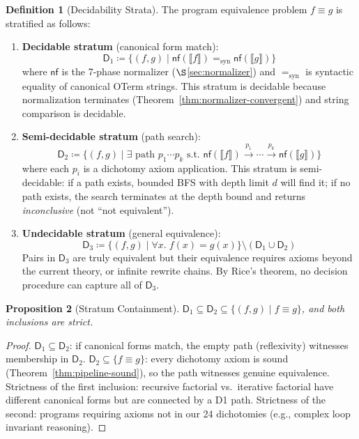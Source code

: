 \documentclass[11pt,a4paper]{report}
\theoremstyle{definition}
\newtheorem{definition}{Definition}[chapter]
\theoremstyle{plain}
\newtheorem{proposition}[definition]{Proposition}
\newcommand{\den}[1]{\llbracket #1 \rrbracket}
\begin{document}
\begin{definition}[Decidability Strata]
\label{def:decidability-strata}
The program equivalence problem $f \equiv g$ is stratified as follows:
\begin{enumerate}
  \item \textbf{Decidable stratum} (canonical form match):
  \[
    \mathsf{D}_1 \coloneqq \{(f,g) \mid \mathsf{nf}(\den{f}) =_{\mathrm{syn}} \mathsf{nf}(\den{g})\}
  \]
  where $\mathsf{nf}$ is the 7-phase normalizer
  ($\S$\ref{sec:normalizer}) and $=_{\mathrm{syn}}$ is syntactic
  equality of canonical OTerm strings.  This stratum is decidable
  because normalization terminates (Theorem~\ref{thm:normalizer-convergent})
  and string comparison is decidable.

  \item \textbf{Semi-decidable stratum} (path search):
  \[
    \mathsf{D}_2 \coloneqq \{(f,g) \mid \exists \text{ path } p_1 \cdots p_k
      \text{ s.t.\ } \mathsf{nf}(\den{f}) \xrightarrow{p_1} \cdots
      \xrightarrow{p_k} \mathsf{nf}(\den{g})\}
  \]
  where each $p_i$ is a dichotomy axiom application.  This stratum
  is semi-decidable: if a path exists, bounded BFS with depth limit
  $d$ will find it; if no path exists, the search terminates at the
  depth bound and returns \emph{inconclusive} (not ``not equivalent'').

  \item \textbf{Undecidable stratum} (general equivalence):
  \[
    \mathsf{D}_3 \coloneqq \{(f,g) \mid \forall x.\; f(x) = g(x)\} \setminus (\mathsf{D}_1 \cup \mathsf{D}_2)
  \]
  Pairs in $\mathsf{D}_3$ are truly equivalent but their equivalence
  requires axioms beyond the current theory, or infinite rewrite
  chains.  By Rice's theorem, no decision procedure can capture
  all of $\mathsf{D}_3$.
\end{enumerate}
\end{definition}

\begin{proposition}[Stratum Containment]
\label{prop:stratum-containment}
$\mathsf{D}_1 \subseteq \mathsf{D}_2 \subseteq \{(f,g) \mid f \equiv g\}$,
and both inclusions are strict.
\end{proposition}

\begin{proof}
$\mathsf{D}_1 \subseteq \mathsf{D}_2$: if canonical forms match,
the empty path (reflexivity) witnesses membership in $\mathsf{D}_2$.
$\mathsf{D}_2 \subseteq \{f \equiv g\}$: every dichotomy axiom is
sound (Theorem~\ref{thm:pipeline-sound}), so the path witnesses
genuine equivalence.  Strictness of the first inclusion: recursive
factorial vs.\ iterative factorial have different canonical forms
but are connected by a D1 path.  Strictness of the second: programs
requiring axioms not in our 24 dichotomies (e.g., complex loop
invariant reasoning).
\end{proof}
\end{document}
